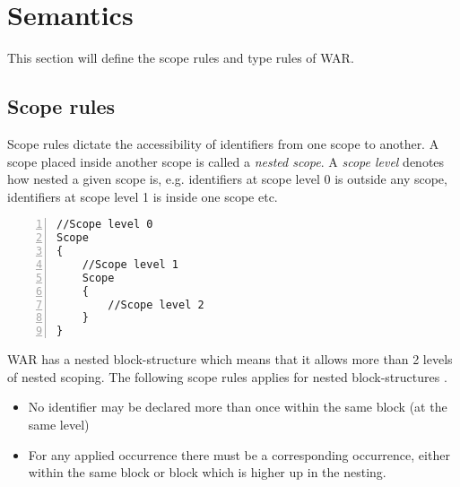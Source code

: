\section{Semantics}
\label{sec:conanal}
This section will define the scope rules and type rules of WAR.
	\subsection{Scope rules}
		Scope rules dictate the accessibility of identifiers from one scope to another.
		A scope placed inside another scope is called a {\it nested scope}. A {\it scope level} denotes how nested a given scope is,
		e.g. identifiers at scope level 0 is outside any scope, identifiers at scope level 1 is inside one scope etc.
		\begin{lstlisting}[basicstyle=\small\sffamily,
			keywords={break,case,const,continue,default,else,enum,
			for,if,return,switch,while,do,long,void,int,float,double,
			char,struct,typedef,include,size\_t},
			keywordstyle={\color{blue}},
			comment={[l]{//}}, morecomment={[s]{/*}{*/}}, commentstyle=\itshape,
			columns={[l]flexible}, numbers=left, numberstyle=\tiny,
			frameround=fftt, frame=shadowbox, captionpos=b,
			caption={Scope levels}]	
//Scope level 0
Scope
{
	//Scope level 1
	Scope
	{
		//Scope level 2
	}
}
		\end{lstlisting}
		
		WAR has a nested block-structure which means that it allows more than 2 levels of nested scoping. 
		The following scope rules applies for nested block-structures \cite{SPOBOG}.
			
	\begin{itemize}
	\item No identifier may be declared more than once within the same block (at the same level) %
	\item For any applied occurrence there must be a corresponding occurrence, either within the same block or block which is higher up in the nesting. 
	\end{itemize}
		
\newpage
	
